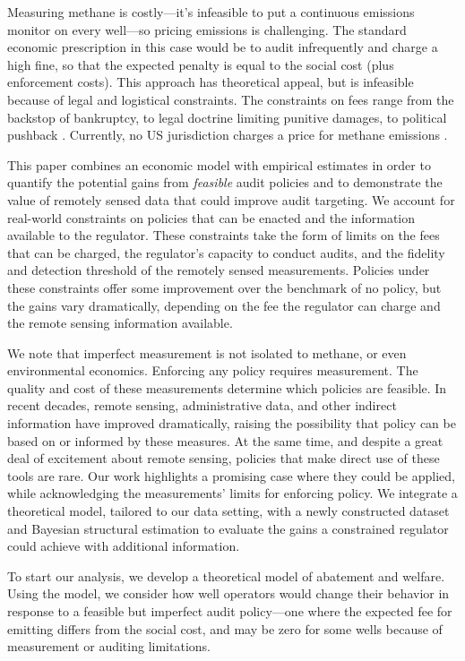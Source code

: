 \documentclass[12pt,oneside,letterpaper]{article}
\theoremstyle{definition}
\begin{document}
\begin{refsection}
Measuring methane is costly---it's infeasible to put a continuous emissions monitor on every well---so pricing emissions is challenging.
The standard economic prescription in this case would be to audit infrequently and charge a high fine, so that the expected penalty is equal to the social cost (plus enforcement costs).
This approach has theoretical appeal, but is infeasible because of legal and logistical constraints.
The constraints on fees range from the backstop of bankruptcy, to legal doctrine limiting punitive damages, to political pushback \parencite{Boomhower:2019, exxon_v_baker:2008}.
Currently, no US jurisdiction charges a price for methane emissions
\parencite{Rabe/Kaliban/Englehart:2020}.

This paper combines an economic model with empirical estimates in order to quantify the potential gains from \emph{feasible} audit policies and to demonstrate the value of remotely sensed data that could improve audit targeting.
We account for real-world constraints on policies that can be enacted and the information available to the regulator.
These constraints take the form of limits on the fees that can be charged, the regulator's capacity to conduct audits, and the fidelity and detection threshold of the remotely sensed measurements.
Policies under these constraints offer some improvement over the benchmark of no policy,
but the gains vary dramatically, depending on the fee the regulator can charge and the remote sensing information available.


We note that imperfect measurement is not isolated to methane, or even environmental economics.
Enforcing any policy requires measurement.
The quality and cost of these measurements determine which policies are feasible.
In recent decades, remote sensing, administrative data, and other indirect information have improved dramatically, raising the possibility that policy can be based on or informed by these measures.
At the same time, and despite a great deal of excitement about remote sensing, policies that make direct use of these tools are rare.
Our work highlights a promising case where they could be applied, while acknowledging the measurements' limits for enforcing policy.
We integrate a theoretical model, tailored to our data setting, with a newly constructed dataset and Bayesian structural estimation to evaluate the gains a constrained regulator could achieve with additional information.

To start our analysis, we develop a theoretical model of abatement and welfare.
Using the model, we consider how well operators would change their behavior in response to a feasible but imperfect audit policy---one where the expected fee for emitting differs from the social cost,
and may be zero for some wells because of measurement or auditing limitations.


\end{refsection}
\end{document}
